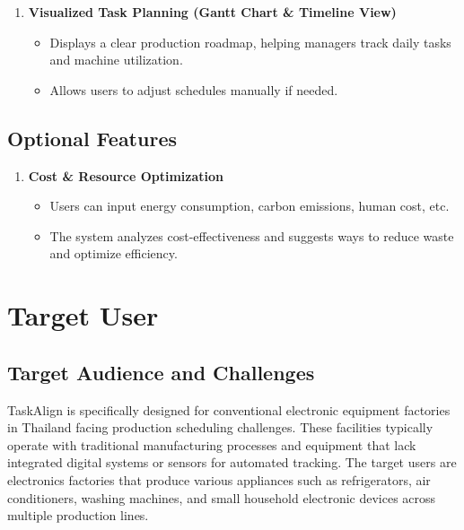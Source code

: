 \begin{enumerate}[leftmargin=80pt]
    \item \textbf{Visualized Task Planning (Gantt Chart \& Timeline View)}
    \begin{itemize}
        \item Displays a clear production roadmap, helping managers track daily tasks and machine utilization.
        \item Allows users to adjust schedules manually if needed.
    \end{itemize}
\end{enumerate}

\subsection{Optional Features}
\label{subsection:optional features}
\begin{enumerate}[leftmargin=80pt]
    \item \textbf{Cost \& Resource Optimization}
    \begin{itemize}
        \item Users can input energy consumption, carbon emissions, human cost, etc.
        \item The system analyzes cost-effectiveness and suggests ways to reduce waste and optimize efficiency.
    \end{itemize}
\end{enumerate}



\section{Target User}
\label{section:target-user}

\subsection{Target Audience and Challenges}

TaskAlign is specifically designed for conventional electronic equipment factories in Thailand facing production scheduling challenges. These facilities typically operate with traditional manufacturing processes and equipment that lack integrated digital systems or sensors for automated tracking. The target users are electronics factories that produce various appliances such as refrigerators, air conditioners, washing machines, and small household electronic devices across multiple production lines.

